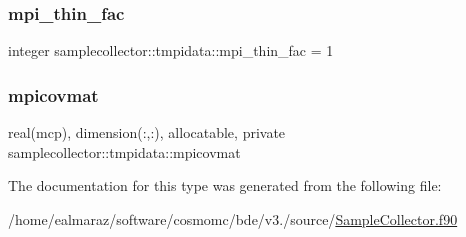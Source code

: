 \mbox{\label{structsamplecollector_1_1tmpidata_a8ac0f621273b186cfe01b7bacfdf05dc}} 
\subsubsection{\texorpdfstring{mpi\+\_\+thin\+\_\+fac}{mpi\_thin\_fac}}
{\footnotesize\ttfamily integer samplecollector\+::tmpidata\+::mpi\+\_\+thin\+\_\+fac = 1\hspace{0.3cm}{\ttfamily [private]}}

\mbox{\label{structsamplecollector_1_1tmpidata_a20e39ef16f167717c444c0c6fc62d999}} 
\subsubsection{\texorpdfstring{mpicovmat}{mpicovmat}}
{\footnotesize\ttfamily real(mcp), dimension(\+:,\+:), allocatable, private samplecollector\+::tmpidata\+::mpicovmat\hspace{0.3cm}{\ttfamily [private]}}



The documentation for this type was generated from the following file\+:\begin{DoxyCompactItemize}
\item 
/home/ealmaraz/software/cosmomc/bde/v3./source/\mbox{\hyperlink{SampleCollector_8f90}{Sample\+Collector.\+f90}}\end{DoxyCompactItemize}
